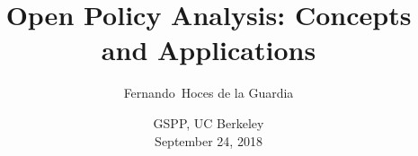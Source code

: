 \documentclass{beamer}
\begin{document}
\title[] %
{Open Policy Analysis: Concepts and Applications}

\subtitle
{}

\author[] %
{Fernando~Hoces de la Guardia}


\date[] %
{GSPP, UC Berkeley\\
September 24, 2018}



\begin{frame}
  \titlepage
\end{frame}

\end{document}
